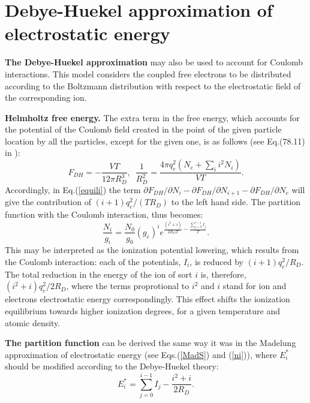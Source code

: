 \section{Debye-Huekel approximation of electrostatic energy}
{\bf The Debye-Huekel approximation} may also be used to account for Coulomb interactions.
This model considers the coupled free electrons to be distributed according to
the Boltzmann distribution with respect to the electrostatic field of the corresponding ion.

{\bf Helmholtz free energy.} The extra term in the free energy, which accounts for the
potential of the Coulomb field created in the point of the given particle location
by all the particles, except for the given one, is as follows (see Eq.(78.11) in \cite{ll}):
\begin{equation}\label{DH}
F_{DH}=-\frac{VT}{12\pi R_D^3},\,\,\,\frac1{R_D^2} = \frac{4\pi q_e^2(N_e+\sum_i{i^2N_i})}{VT}.
\end{equation}
Accordingly, in Eq.(\ref{equili}) the term $\partial F_{DH}/\partial N_i -\partial F_{DH}/\partial N_{i+1}-\partial F_{DH}/\partial N_e$ will 
give the contribution of $(i+1)q^2_e/(TR_D)$ to the left hand side. The partition function with the Coulomb interaction, thus becomes:
\begin{equation}\label{pfDH}
\frac{N_{i}}{g_{i}}=\frac{N_0}{g_0}(g_e)^ie^{\frac{(i^2+i)}{2R_DT}-\frac{\sum_{j=0}^{i-1}I_j}T}.
\end{equation}
This may be interpreted as the ionization potential lowering, which results from the Coulomb interaction: each of the potentials, $I_i$, is reduced
by $(i+1)q_e^2/R_D$. The total reduction in the energy of the ion of sort $i$ is, therefore, $(i^2+i)q_e^2/2R_D$, where the terms proprotional to $i^2$ and $i$ 
stand for ion and electrons electrostatic energy correspondingly. This effect shifts the ionization equilibrium towards higher ionization degrees, for a given 
temperature and atomic density. 

{\bf The partition function} can be derived the same way it was in the Madelung approximation of electrostatic energy
(see Eqs.(\ref{MadS}) and (\ref{ni})), where $E^*_i$ should be modified according to the Debye-Huekel theory:
\begin{equation}
E^*_i = \sum_{j=0}^{i-1}{I_j} - \frac{i^2+i}{2 R_D}.
\end{equation}

